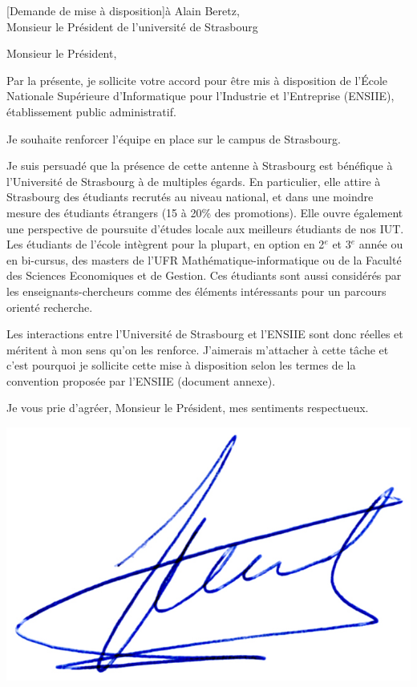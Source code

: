 \documentclass[a4paper,10pt]{article}
\begin{document}


\begin{letter}[Demande de mise à disposition]{à}%
{Alain Beretz, \\Monsieur le Président de l'université de Strasbourg}


Monsieur le Président,


Par la présente, je sollicite votre accord pour être mis à disposition de 
l'\'Ecole Nationale Supérieure d’Informatique pour l'Industrie et l'Entreprise
(ENSIIE), établissement public administratif.

Je souhaite renforcer l'équipe en place sur le campus de Strasbourg.

Je suis persuadé que la présence de cette antenne à Strasbourg est bénéfique
à l'Université de Strasbourg à de multiples égards. En particulier, elle
attire à Strasbourg des étudiants recrutés au niveau national, et dans une
moindre mesure des étudiants étrangers (15 à 20\% des promotions). 
Elle ouvre également une perspective de poursuite d'études locale aux meilleurs
étudiants de nos IUT.
Les étudiants de l'école intègrent pour la plupart, en option en 2$^e$ et 3$^e$ 
année ou en bi-cursus,  des masters de l'UFR Mathématique-informatique ou de la Faculté 
des Sciences Economiques et de Gestion. Ces étudiants sont aussi considérés
par les enseignants-chercheurs comme des éléments intéressants pour un parcours
orienté recherche.

Les interactions entre l'Université de Strasbourg et l'ENSIIE sont donc réelles
et méritent à mon sens qu'on les renforce. J'aimerais m'attacher à cette tâche
et c'est pourquoi je sollicite cette mise à disposition selon les termes de
la convention proposée par l'ENSIIE (document annexe).



Je vous prie d'agréer, Monsieur le Président, mes sentiments respectueux.

\end{letter}
\begin{flushright}
\includegraphics[width=.30\textwidth]{signgenaud.jpg}
\end{flushright}
\end{document}
